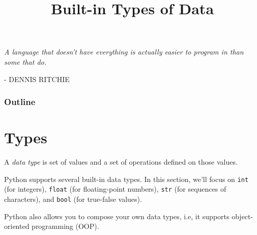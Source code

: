 \documentclass[8pt,a4paper,compress,handout]{beamer}
\title{Built-in Types of Data}
\date{}
\begin{document}
\begin{frame}
\hfill
\begin{minipage}{150pt}
\begin{flushright}
\tiny \emph{A language that doesn't have everything is actually easier to program in than some that do.} 

\smallskip

- DENNIS RITCHIE
\end{flushright}
\end{minipage}
\vfill
\titlepage
\end{frame}

\begin{frame}
\frametitle{Outline}
\tableofcontents
\end{frame}

\section{Types}
\begin{frame}[fragile]
A \emph{data type} is set of values and a set of operations defined on those values.

\bigskip

Python supports several built-in data types. In this section, we'll focus on \lstinline{int} (for integers), \lstinline{float} (for floating-point numbers), \lstinline{str} (for sequences of characters), and \lstinline{bool} (for true-false values).

\bigskip

Python also allows you to compose your own data types, i.e, it supports object-oriented programming (OOP).
\end{frame}
\end{document}
